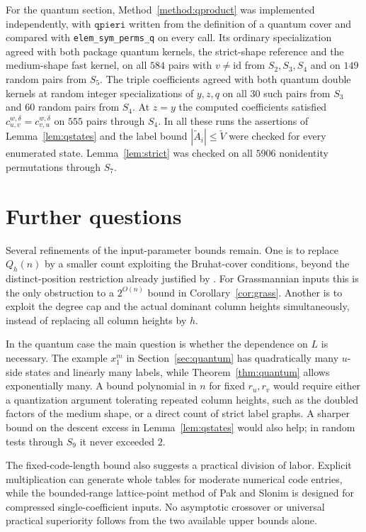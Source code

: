 \documentclass{amsart}
\theoremstyle{definition}
\theoremstyle{remark}
\numberwithin{equation}{section}
\newcommand{\id}{\mathrm{id}}
\begin{document}
For the quantum section, Method~\ref{method:qproduct} was implemented
independently, with $\mathtt{qpieri}$ written from the definition of a
quantum cover and compared with \texttt{elem\_sym\_perms\_q} on every
call.
Its ordinary specialization agreed with both package quantum kernels,
the strict-shape reference and the medium-shape fast kernel, on all
$584$ pairs with $v\neq\id$ from $S_2,S_3,S_4$ and on $149$ random
pairs from $S_5$.
The triple coefficients agreed with both quantum double kernels at
random integer specializations of $y,z,q$ on all $30$ such pairs from
$S_3$ and $60$ random pairs from $S_4$.
At $z=y$ the computed coefficients satisfied
$c_{u,v}^{w,\delta}=c_{v,u}^{w,\delta}$ on $555$ pairs through $S_4$.
In all these runs the assertions of Lemma~\ref{lem:qstates} and the label
bound $|\tilde A_i|\leq\widetilde V$ were checked for every
enumerated state.
Lemma~\ref{lem:strict} was checked on all $5906$ nonidentity
permutations through $S_7$.

\section{Further questions}

Several refinements of the input-parameter bounds remain.
One is to replace $Q_h(n)$ by a smaller count exploiting the
Bruhat-cover conditions, beyond the distinct-position restriction
already justified by \cite{samuelquantum}.
For Grassmannian inputs this is the only obstruction to a $2^{O(n)}$
bound in Corollary~\ref{cor:grass}.
Another is to exploit the degree cap and the actual dominant column
heights simultaneously, instead of replacing all column heights by $h$.

In the quantum case the main question is whether the dependence on
$L$ is necessary.
The example $x_1^m$ in Section~\ref{sec:quantum} has quadratically many
$u$-side states and linearly many labels, while
Theorem~\ref{thm:quantum} allows exponentially many.
A bound polynomial in $n$ for fixed $r_u,r_v$ would require either a
quantization argument tolerating repeated column heights, such as the
doubled factors of the medium shape, or a direct count of strict label
graphs.
A sharper bound on the descent excess in Lemma~\ref{lem:qstates} would
also help; in random tests through $S_9$ it never exceeded $2$.

The fixed-code-length bound also suggests a practical division of labor.
Explicit multiplication can generate whole tables for moderate numerical
code entries, while the bounded-range lattice-point method of
Pak and Slonim is designed for compressed single-coefficient inputs.
No asymptotic crossover or universal practical superiority follows from
the two available upper bounds alone.
\end{document}
